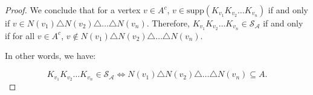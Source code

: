 \documentclass{article}
\newcommand{\identity}{\mathds{1}}
\begin{document}
\begin{proof}

We conclude that for a vertex $ v \in A^c $, $ v \in \text{supp}( K_{v_1} K_{v_2} \dots K_{v_n}) $ if and only if $ v \in N(v_1) \triangle N(v_2) \triangle \dots \triangle N(v_n)$. Therefore, $ K_{v_1} K_{v_2} \dots K_{v_n} \in \mathcal{S_A} $ if and only if for all $ v \in A^c $, $ v \notin N(v_1) \triangle N(v_2) \triangle \dots \triangle N(v_n) $. 

In other words, we have:

\begin{equation}
K_{v_1} K_{v_2} \dots K_{v_n} \in \mathcal{S_A} \iff N(v_1) \triangle N(v_2) \triangle \dots \triangle N(v_n) \subseteq A.
\end{equation}

\end{proof}









 
 
\end{document}
